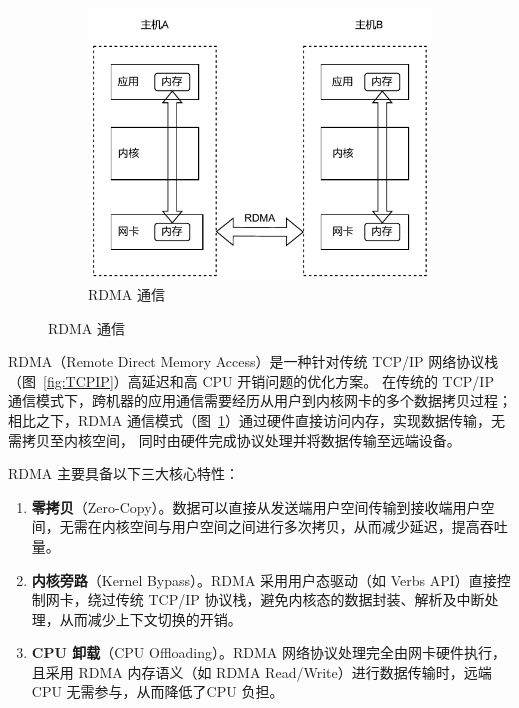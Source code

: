 {\begin{figure}[!htbp]
        ~~~~~%
        \begin{subfigure}[b]{0.50\textwidth}
            \includegraphics[width=\textwidth]{Img/RDMA通信.drawio.pdf}
            \caption{RDMA 通信}
            \label{fig:RDMA}
        \end{subfigure}
        \label{fig:DMA-RDMA}
    \end{figure}

    RDMA（Remote Direct Memory Access）是一种针对传统 TCP/IP 网络协议栈（图~\ref{fig:TCPIP}）高延迟和高 CPU 开销问题的优化方案。
    在传统的 TCP/IP 通信模式下，跨机器的应用通信需要经历从用户到内核网卡的多个数据拷贝过程；
    相比之下，RDMA 通信模式（图~\ref{fig:RDMA}）通过硬件直接访问内存，实现数据传输，无需拷贝至内核空间，
    同时由硬件完成协议处理并将数据传输至远端设备。

    RDMA 主要具备以下三大核心特性：
    \begin{enumerate}[label=\arabic*.]
        \item \textbf{零拷贝}（Zero-Copy）。数据可以直接从发送端用户空间传输到接收端用户空间，无需在内核空间与用户空间之间进行多次拷贝，从而减少延迟，提高吞吐量。
        \item \textbf{内核旁路}（Kernel Bypass）。RDMA 采用用户态驱动（如 Verbs API）直接控制网卡，绕过传统 TCP/IP 协议栈，避免内核态的数据封装、解析及中断处理，从而减少上下文切换的开销。
        \item \textbf{CPU 卸载}（CPU Offloading）。RDMA 网络协议处理完全由网卡硬件执行，
              且采用 RDMA 内存语义（如 RDMA Read/Write）进行数据传输时，远端 CPU 无需参与，从而降低了CPU 负担。
    \end{enumerate}

}
